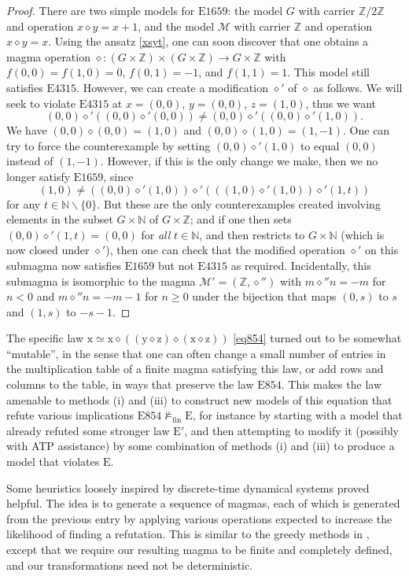 \documentclass[12pt]{amsart}
\theoremstyle{definition}
\newcommand{\N}{\mathbb{N}}
\newcommand{\Z}{\mathbb{Z}}
\newcommand{\x}{\mathrm{x}}
\newcommand{\y}{\mathrm{y}}
\newcommand{\z}{\mathrm{z}}
\newcommand{\op}{\diamond}
\newcommand{\formaleq}{\simeq}
\newcommand{\nmodels}{\not\models}
\newcommand{\nmodelsfin}{\nmodels_{\mathrm{fin}}}
\newcommand{\Magma}{{\mathcal{M}}}
\newcommand{\Eq}[1]{\mathrm{E}#1}
\newcommand{\E}{\mathrm{E}}
\begin{document}
\begin{proof}  There are two simple models for $\Eq{1659}$: the model $G$ with carrier $\Z/2\Z$ and operation $x \op y = x+1$, and the model $\Magma$ with carrier $\Z$ and operation $x \op y = x$.  Using the ansatz \eqref{xsyt}, one can soon discover that one obtains a magma operation $\op: (G \times \Z) \times (G \times \Z) \to G \times \Z$ with $f(0,0)=f(1,0)=0$, $f(0,1)=-1$, and $f(1,1)=1$.  This model still satisfies $\Eq{4315}$. However, we can create a modification $\op'$ of $\op$ as follows.  We will seek to violate $\Eq{4315}$ at $x = (0,0)$, $y = (0,0)$, $z = (1,0)$, thus we want
$$ (0,0) \op' ((0,0) \op' (0,0)) \neq (0,0) \op' ((0,0) \op' (1,0)).$$
We have $(0,0) \op (0,0) = (1,0)$ and $(0,0) \op (1,0) = (1,-1)$.  One can try to force the counterexample by setting $(0,0) \op' (1,0)$ to equal $(0,0)$ instead of $(1,-1)$. However, if this is the only change we make, then we no longer satisfy $\Eq{1659}$, since
$$ (1,0) \neq ((0,0) \op' (1,0)) \op' (((1,0) \op' (1,0)) \op' (1,t))$$
for any $t \in \N \backslash \{0\}$. But these are the only counterexamples created involving elements in the subset $G \times \N$ of $G \times \Z$; and if one then sets $(0,0) \op' (1,t) = (0,0)$ for \emph{all} $t \in \N$, and then restricts to $G \times \N$ (which is now closed under $\op'$), then one can check that the modified operation $\op'$ on this submagma now satisfies $\Eq{1659}$ but not $\Eq{4315}$ as required.
Incidentally, this submagma is isomorphic to the magma $\Magma'=(\Z,\op'')$ with $m\op''n=-m$ for $n<0$ and $m\op''n=-m-1$ for $n\geq 0$ under the bijection that maps $(0,s)$ to $s$ and $(1,s)$ to $-s-1$.
\end{proof}

The specific law $\x \formaleq \x \op ((\y \op \z) \op (\x \op \z))$ \eqref{eq854} turned out to be somewhat ``mutable'', in the sense that one can often change a small number
 of entries in the multiplication table of a finite magma satisfying this law, or add rows and columns to the table,
 in ways that preserve the law $\Eq{854}$.  This makes the law amenable to methods (i) and (iii) to construct new models of this equation that
 refute various implications  $\Eq{854} \nmodelsfin \E$, for instance by starting with a model that already refuted some stronger law ${\E'}$, and then attempting to modify it
 (possibly with ATP assistance) by some combination of methods (i) and (iii) to produce a model that violates $\E$.

 Some heuristics loosely inspired by discrete-time dynamical systems proved helpful.
 The idea is to generate a sequence of magmas, each of which is generated from the previous entry by applying various operations expected to increase the likelihood of
 finding a refutation.  This is similar to the greedy methods in , except that we require our resulting magma to be finite and completely
 defined, and our transformations need not be deterministic.
\end{document}
